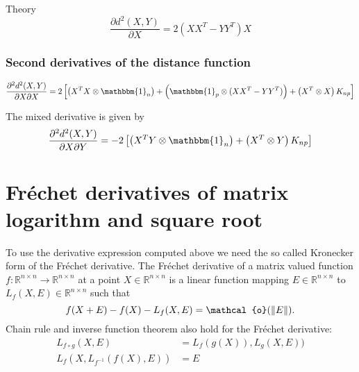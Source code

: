 \begin{chapter}{Theory}
\begin{equation}
    \label{eq:gr_x_der}
    \frac{\partial d^2(X,Y)}{\partial X} = 2\left(XX^T-YY^T\right)X
\end{equation}



\subsubsection{Second derivatives of the distance function} %
\label{ssub:Second derivatives of the distance function}

\begin{equation}
    \label{eq:gr_xx_der}
    \frac{\partial^2 d^2(X,Y)}{\partial X\partial X} = 2
    \left[
	\left(X^TX\otimes \mathbbm{1}_{n}\right) 
	+ \left(\mathbbm{1}_p\otimes (XX^T-YY^T)\right)
	+ \left(X^T\otimes X\right)K_{np}
    \right]
\end{equation}

The mixed derivative is given by
\begin{equation}
    \label{eq:gr_xy_der}
    \frac{\partial^2 d^2(X,Y)}{\partial X\partial Y} = -2\left[\left(X^TY\otimes \mathbbm{1}_{n}\right) + \left(X^T\otimes Y\right)K_{np}\right]
\end{equation}






\section{Fr\'{e}chet derivatives of matrix logarithm and square root} %
\label{sec:frechetderivatives}
To use the derivative expression computed above we need the so called Kronecker form of the Fr\'{e}chet derivative. The Fr\'{e}chet derivative
of a matrix valued function $f:\mathbb{R}^{n\times n}\to\mathbb{R}^{n\times n}$ at a point $X\in\mathbb{R}^{n\times n}$ is a linear function mapping $E\in\mathbb{R}^{n\times n}$
to $L_f(X,E)\in \mathbb{R}^{n\times n}$ such that
\begin{equation}
    f(X+E) - f(X) - L_f(X,E) = \mathcal{o}(\norm{E}).
\end{equation}
Chain rule and inverse function theorem also hold for the Fr\'{e}chet derivative:
\begin{align}
    L_{f\circ g}(X, E) &= L_{f}(g(X)),L_{g}(X,E))\\
    L_{f}(X, L_{f^{-1}}(f(X),E)) &= E
\end{align}


\end{chapter}
